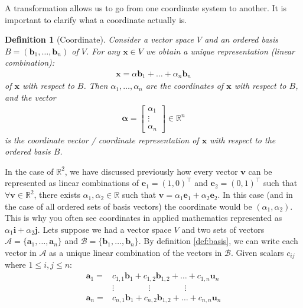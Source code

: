 \documentclass[a4paper,12pt]{book}
\newcommand{\set}[1]{\mathcal{#1}}
\newcommand{\vectr}[1]{\textbf{#1}}
\newcommand{\real}{\mathbb{R}}
\newtheorem{definition}{Definition}[section]
\begin{document}
	A transformation allows us to go from one coordinate system to another. It is important to clarify what a coordinate actually is. 
	\begin{definition}[Coordinate]
		\normalfont Consider a vector space $ V $ and an ordered basis $ B = (\vectr{b}_1, \ldots, \vectr{b}_n) $ of $ V $. For any $ \vectr{x} \in V $ we obtain a unique representation (linear combination):
		\begin{align}
			\vectr{x} = \alpha \vectr{b}_1 + \ldots + \alpha_n \vectr{b}_n 
		\end{align}
		of $ \vectr{x} $ with respect to $ B $. Then $ \alpha_1, \ldots, \alpha_n $ are the coordinates of $ \vectr{x} $ with respect to $ B $, and the vector
		\begin{align}
			\boldsymbol{\alpha} = \begin{bmatrix}
				\alpha_1 \\
				\vdots \\
				\alpha_n
			\end{bmatrix} \in \real^{n} 
		\end{align}
	is the coordinate vector / coordinate representation of $ \vectr{x} $ with respect to the ordered basis $ B $.
	\label{def:coordinate}
	\end{definition}
	In the case of $ \real^{2} $, we have discussed previously how every vector $ \vectr{v} $ can be represented as linear combinations of $ \vectr{e}_1 = (1, 0)^{\top} $ and $ \vectr{e}_2 = (0, 1)^{\top} $ such that $ \forall \vectr{v} \in \real^{2} $, there exists $ \alpha_1, \alpha_2 \in \real $ such that $ \vectr{v} = \alpha_1 \vectr{e}_1 + \alpha_2 \vectr{e}_2 $. In this case (and in the case of all ordered sets of basis vectors) the coordinate would be $ (\alpha_1, \alpha_2) $. This is why you often see coordinates in applied mathematics represented as $ \alpha_1 \vectr{i} + \alpha_2 \vectr{j} $. Lets suppose we had a vector space $ V $ and two sets of vectors $ \set{A} = \{\vectr{a}_1,\ldots,\vectr{a}_n\} $ and $ \set{B} = \{\vectr{b}_1,\ldots,\vectr{b}_n\} $.  By definition \ref{def:basis}, we can write each vector in $ \set{A} $ as a unique linear combination of the vectors in $ \set{B} $. Given scalars $ c_{ij} $ where $ 1 \leq i,j \leq n $:
	\begin{align*}
		\vectr{a}_1 =& c_{1,1}\vectr{b}_1 + c_{1,2}\vectr{b}_{1,2} + \ldots + c_{1,n}\vectr{u}_n \\
		  &\vdots \hspace{50pt} \vdots \hspace{50pt} \vdots \\ 
		 \vectr{a}_n =& c_{n,1}\vectr{b}_1 + c_{n,2}\vectr{b}_{1,2} + \ldots + c_{n,n}\vectr{u}_n 
	\end{align*}
\end{document}
